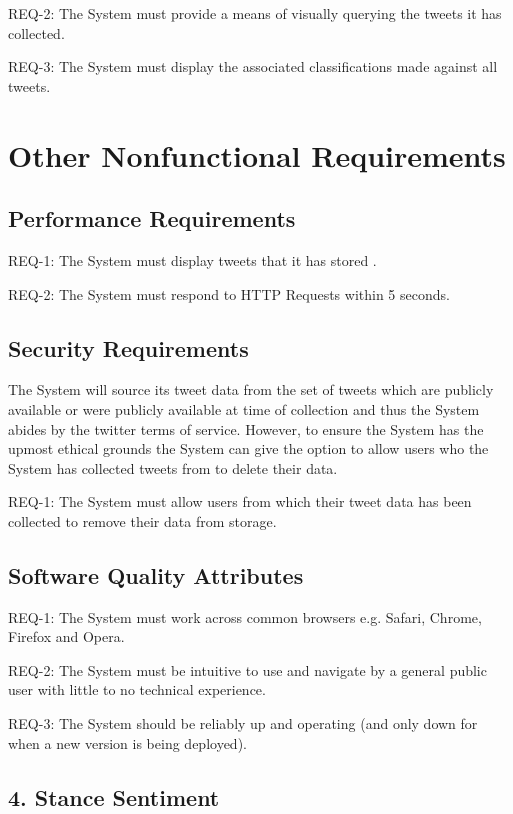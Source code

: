 \documentclass[11pt]{report}
\begin{document}
REQ-2: The System must provide a means of visually querying the tweets it has collected.

REQ-3:	The System must display the associated classifications made against all tweets.

\section*{Other Nonfunctional Requirements}

\subsection*{Performance Requirements}
REQ-1: The System must display tweets that it has stored . 

REQ-2: The System must respond to HTTP Requests within 5 seconds.

\subsection*{Security Requirements}
The System will source its tweet data from the set of tweets which are publicly available or were publicly available at time of collection and thus the System abides by the twitter terms of service. However, to ensure the System has the upmost ethical grounds the System can give the option to allow users who the System has collected tweets from to delete their data.

REQ-1: The System must allow users from which their tweet data has been collected to remove their data from storage.

\subsection*{Software Quality Attributes}
REQ-1: The System must work across common browsers e.g. Safari, Chrome, Firefox and Opera.

REQ-2: The System must be intuitive to use and navigate by a general public user with little to no technical experience.

REQ-3: The System should be reliably up and operating (and only down for when a new version is being deployed).









\subsection*{4. Stance Sentiment}
\end{document}
